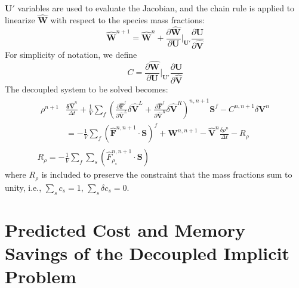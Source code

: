 $\mathbf{U}'$ variables are used to evaluate the Jacobian, and the chain rule is
applied to linearize $\mathbf{\hat{W}}$ with respect to the species mass
fractions:
\begin{equation}
  \mathbf{\hat{W}}^{n+1} = \mathbf{\hat{W}}^n+\frac{\partial
  \mathbf{\hat{W}}}{\partial \mathbf{U}}\bigg|_{\mathbf{U}'} \frac{\partial
  \mathbf{U}}{\partial \mathbf{\hat{V}}} 
\end{equation}
For simplicity of notation, we define
\begin{equation}
  C = \frac{\partial \mathbf{\hat{W}}}{\partial
  \mathbf{U}}\bigg|_{\mathbf{U}'} \frac{\partial \mathbf{U}}{\partial
  \mathbf{\hat{V}}}
\end{equation}
The decoupled system to be solved becomes:
\begin{gather} 
  \begin{split}
    \rho^{n+1}&\frac{\mathbf{\delta \hat{V}}^n}{\Delta t}
    +\frac{1}{V}\sum\limits_{f}(\frac{\partial \mathbf{\hat{F}}^f}{\partial
    \mathbf{\hat{V}}^L}\delta	\mathbf{\hat{V}}^L
    +\frac{\partial \mathbf{\hat{F}}^f}{\partial \mathbf{\hat{V}}^R}\delta
    \mathbf{\hat{V}}^R)^{n, n+1}\mathbf{S}^f - C^{n, n+1}\delta\mathbf{V}^n \\
    &= -\frac{1}{V}\sum\limits_{f}(\mathbf{\hat{F}}^{n,n+1}\cdot\mathbf{S})^f +
    \mathbf{W}^{n, n+1} -\mathbf{\hat{V}}^n\frac{\delta \rho^n}{\Delta t} -
    R_\rho
  \end{split} \\ 
  R_\rho = -\frac{1}{V}\sum\limits_{f}{\sum\limits_{s}
  {(\hat{F}_{\rho_s}^{n,n+1}\cdot\mathbf{S})}}
\end{gather}
where $R_\rho$ is included to preserve the constraint that the mass fractions
sum to unity, i.e., $\sum\limits_{s}{c_s}=1$, $\sum\limits_{s}{\delta
c_s}=0$.

\section{Predicted Cost and Memory Savings of the Decoupled Implicit Problem}

